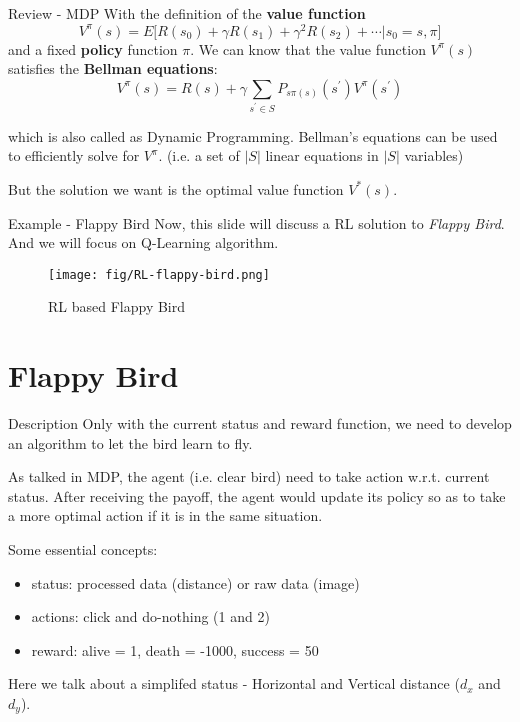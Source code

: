 \documentclass[10pt]{beamer}
\begin{document}
\begin{frame}{Review - MDP}
  With the definition of the \textbf{value function} $$V^{\pi}(s)=E\bigl[R(s_0) + \gamma R(s_1) + \gamma^2 R(s_2) + \cdots|s_0=s, \pi\bigr]$$ and a fixed \textbf{policy} function $\pi$. We can know that the value function $V^{\pi}(s)$ satisfies the \textbf{Bellman equations}: $$V^{\pi}(s)=R(s) + \gamma\sum_{s^{'}\in S}P_{s\pi(s)}(s^{'})V^{\pi}(s^{'})$$

  which is also called as \alert{Dynamic Programming}. Bellman's equations can be used to efficiently solve for $V^{\pi}$. (i.e. a set of $|S|$ linear equations in $|S|$ variables)

  But the solution we want is the optimal value function $V^{*}(s)$.
\end{frame}

\begin{frame}[fragile]{Example - Flappy Bird}
  Now, this slide will discuss a RL solution to \textit{Flappy Bird}. And we will focus on Q-Learning algorithm. 
  \begin{figure}[htbp]
    \centering
    \texttt{[image: fig/RL-flappy-bird.png]}
    \caption{RL based Flappy Bird}
  \end{figure}
\end{frame}

\section{Flappy Bird}

\begin{frame}[fragile]{Description}
  Only with the current status and reward function, we need to develop an algorithm to let the bird learn to fly.

  As talked in MDP, the agent (i.e. clear bird) need to take action w.r.t. current status. After receiving the payoff, the agent would update its policy so as to take a more optimal action if it is in the same situation.

  Some essential concepts:
  \begin{itemize}
    \item status: processed data (distance) or raw data (image)
    \item actions: click and do-nothing (1 and 2)
    \item reward: alive = 1, death = -1000, success = 50
  \end{itemize}

  Here we talk about a simplifed status - Horizontal and Vertical distance ($d_x$ and $d_y$).
\end{frame}
\end{document}
